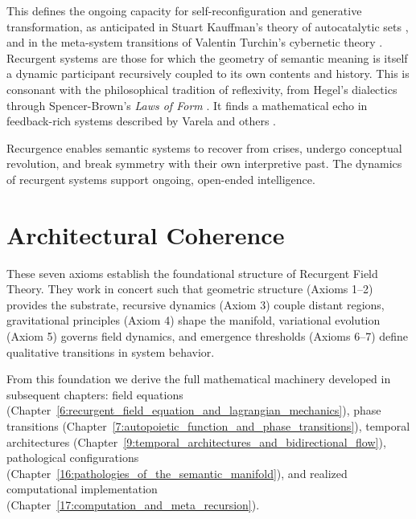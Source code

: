 This defines the ongoing capacity for self-reconfiguration and generative transformation, as anticipated in Stuart Kauffman's theory of autocatalytic sets \autocite{Kauffman1993}, and in the meta-system transitions of Valentin Turchin's cybernetic theory \autocite{Turchin1977}. Recurgent systems are those for which the geometry of semantic meaning is itself a dynamic participant recursively coupled to its own contents and history. This is consonant with the philosophical tradition of reflexivity, from Hegel's dialectics \autocite{Hegel1807} through Spencer-Brown's \textit{Laws of Form} \autocite{SpencerBrown1969}. It finds a mathematical echo in feedback-rich systems described by Varela and others \autocite{Varela1979, Rosen1991}.

Recurgence enables semantic systems to recover from crises, undergo conceptual revolution, and break symmetry with their own interpretive past. The dynamics of recurgent systems support ongoing, open-ended intelligence.


\section{Architectural Coherence}
\label{1.4:architectural_coherence}

These seven axioms establish the foundational structure of Recurgent Field Theory. They work in concert such that geometric structure (Axioms 1--2) provides the substrate, recursive dynamics (Axiom 3) couple distant regions, gravitational principles (Axiom 4) shape the manifold, variational evolution (Axiom 5) governs field dynamics, and emergence thresholds (Axioms 6--7) define qualitative transitions in system behavior.

From this foundation we derive the full mathematical machinery developed in subsequent chapters: field equations (Chapter~\ref{6:recurgent_field_equation_and_lagrangian_mechanics}), phase transitions (Chapter~\ref{7:autopoietic_function_and_phase_transitions}), temporal architectures (Chapter~\ref{9:temporal_architectures_and_bidirectional_flow}), pathological configurations (Chapter~\ref{16:pathologies_of_the_semantic_manifold}), and realized computational implementation (Chapter~\ref{17:computation_and_meta_recursion}).
